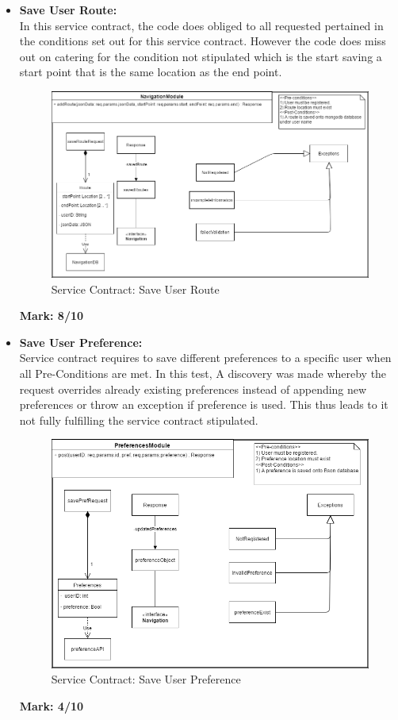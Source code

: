 \begin{itemize}
	
\item \textbf{Save User Route:}\\In this service contract, the code does obliged to all requested pertained in the conditions set out for this service contract. However the code does miss out on catering for the condition not stipulated which is the start saving a start point that is the same location as the end point.\\
\begin{figure}[H]
\includegraphics[scale=0.5]{service_contracts/SaveRoute.png}
\caption{Service Contract: Save User Route}
\end{figure}

\textbf{Mark: 8/10}
\newpage
\item \textbf{Save User Preference:}\\Service contract requires to save different preferences to a specific user when all Pre-Conditions are met. In this test, A discovery was made whereby the request overrides already existing preferences instead of appending new preferences or throw an exception if preference is used. This thus leads to it not fully fulfilling the service contract stipulated.\\
\begin{figure}[H]
\includegraphics[scale=0.5]{service_contracts/SPrefServiceContract.png}
\caption{Service Contract: Save User Preference}
\end{figure}
	\textbf{Mark: 4/10}
	

\end{itemize}
